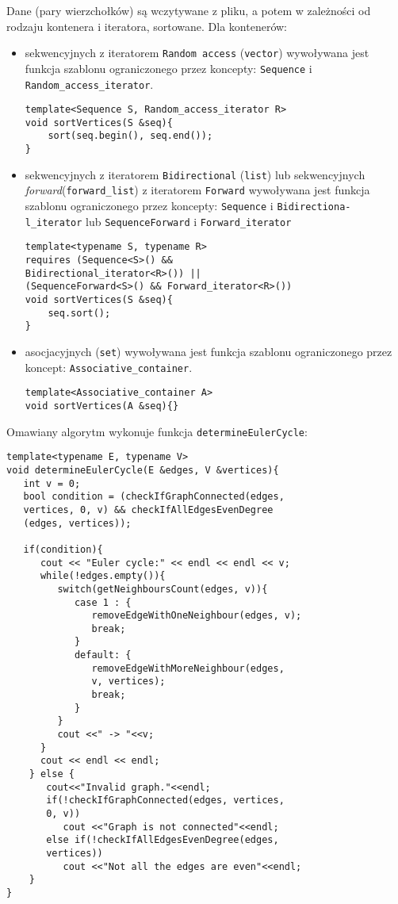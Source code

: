 \documentclass[11pt, a4paper]{article}
\begin{document}
Dane (pary wierzchołków) są wczytywane z pliku, a potem w zależności od rodzaju kontenera i iteratora, sortowane. Dla kontenerów: 
\begin{itemize}
\item sekwencyjnych z iteratorem \verb#Random access# (\verb#vector#) wywoływana jest funkcja szablonu ograniczonego przez koncepty: \verb#Sequence# i \newline \verb#Random_access_iterator#.

\begin{lstlisting}[frame=single]
template<Sequence S, Random_access_iterator R>
void sortVertices(S &seq){
    sort(seq.begin(), seq.end());
}
\end{lstlisting}

\item sekwencyjnych z iteratorem \verb#Bidirectional# (\verb#list#) lub sekwencyjnych \emph{forward}(\verb#forward_list#) z iteratorem \verb#Forward# wywoływana jest funkcja szablonu ograniczonego przez koncepty: \verb#Sequence# i \verb#Bidirectiona-# \newline \verb#l_iterator# lub \verb#SequenceForward# i \verb#Forward_iterator#

\begin{lstlisting}[frame=single]
template<typename S, typename R>
requires (Sequence<S>() && 
Bidirectional_iterator<R>()) || 
(SequenceForward<S>() && Forward_iterator<R>())
void sortVertices(S &seq){
    seq.sort();
}
\end{lstlisting}

\item asocjacyjnych (\verb#set#) wywoływana jest funkcja szablonu ograniczonego przez koncept: \verb#Associative_container#.

\begin{lstlisting}[frame=single]
template<Associative_container A>
void sortVertices(A &seq){}
\end{lstlisting}

\end{itemize}
\newpage
\noindent Omawiany algorytm wykonuje funkcja \verb#determineEulerCycle#:
\begin{lstlisting}[frame=single]
template<typename E, typename V>
void determineEulerCycle(E &edges, V &vertices){
   int v = 0;
   bool condition = (checkIfGraphConnected(edges, 
   vertices, 0, v) && checkIfAllEdgesEvenDegree
   (edges, vertices));
    
   if(condition){
      cout << "Euler cycle:" << endl << endl << v;
      while(!edges.empty()){
         switch(getNeighboursCount(edges, v)){
            case 1 : {
               removeEdgeWithOneNeighbour(edges, v);
               break;
            }
            default: {
               removeEdgeWithMoreNeighbour(edges,
               v, vertices);
               break;
            }
         }
         cout <<" -> "<<v;
      }
      cout << endl << endl;
    } else {
       cout<<"Invalid graph."<<endl;
       if(!checkIfGraphConnected(edges, vertices,
       0, v))
          cout <<"Graph is not connected"<<endl;
       else if(!checkIfAllEdgesEvenDegree(edges,
       vertices))
          cout <<"Not all the edges are even"<<endl;
    }
}
\end{lstlisting}
\end{document}
